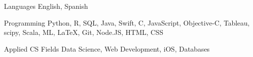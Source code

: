 

\begin{cvskills}

\cvskill
  {Languages} %
  {English, Spanish} %

  \cvskill
    {Programming} %
    {Python, R, SQL, Java, Swift, C, JavaScript, Objective-C, Tableau, scipy, Scala, ML, LaTeX, Git, Node.JS, HTML, CSS} %

  \cvskill
    {Applied CS Fields} %
    {Data Science, Web Development, iOS, Databases} %

\end{cvskills}
